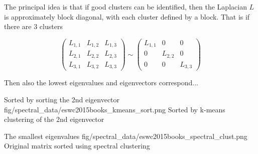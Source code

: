 The principal idea is that if good clusters can be identified, then the Laplacian $L$ is approximately block diagonal, with each cluster defined by a block. That is if there are 3 clusters

\begin{equation}
    \begin{pmatrix}
        L_{1, 1} & L_{1, 2} & L_{1, 3} \\
        L_{2, 1} & L_{2, 2} & L_{2, 3} \\
        L_{3, 1} & L_{3, 2} & L_{3, 3}
    \end{pmatrix}
    \sim
    \begin{pmatrix}
        L_{1, 1} & 0         & 0         \\
        0        & L_{2, 2} & 0      \\
        0        & 0         & L_{3, 3}
    \end{pmatrix}
\end{equation}

Then also the lowest eigenvalues and eigenvectors correspond...

{Sorted by sorting the 2nd eigenvector}
{fig/spectral_data/eswc2015books_kmeans_sort.png}
{Sorted by k-means clustering of the 2nd eigenvector}



{The smallest eigenvalues}
{fig/spectral_data/eswc2015books_spectral_clust.png}
{Original matrix sorted using spectral clustering}

